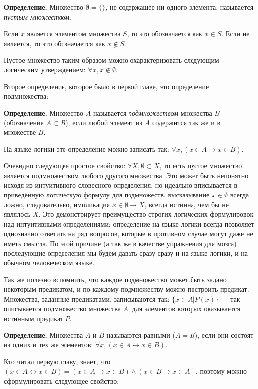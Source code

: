 {\bfseries Определение.} Множество $\emptyset=\{\}$, не содержащее ни одного элемента, называется {\slshape пустым множеством}.

Если $x$ является элементом множества $S$, то это обозначается как $x \in S$. Если не является, то это обозначается как $x \not\in S$.

Пустое множество таким образом можно охарактеризовать следующим логическим утверждением: $\forall x, x \not \in \emptyset$.

Второе определение, которое было в первой главе, это определение подмножества:

{\bfseries Определение.} Множество $A$ называется {\slshape подмножеством} множества $B$ (обозначение $A\subset B$), если любой элемент из $A$ содержится так же и в множестве $B$.

На языке логики это определение можно записать так: $\forall x, (x\in A\rightarrow x\in B)$.

Очевидно следующее простое свойство: $\forall X, \emptyset\subset X$, то есть пустое множество является подмножеством любого другого множества. Это может быть непонятно исходя из интуитивного словесного определения, но идеально вписывается в приведённую логическую формулу для подмножеств: высказывание $x\in\emptyset$ всегда ложно, следовательно, импликация $x\in\emptyset \rightarrow X$, всегда истинна, чем бы не являлось $X$. Это демонстрирует преимущество строгих логических формулировок над интуитивными определениями: определение на языке логики всегда позволяет однозначно ответить на ряд вопросов, которые в противном случае могут даже не иметь смысла. По этой причине (а так же в качестве упражнения для мозга) последующие определения мы будем давать сразу сразу и на языке логики, и на обычном человеческом языке.

Так же полезно вспомнить, что каждое подмножество может быть задано некоторым предикатом, и по каждому подмножеству можно построить предикат. Множества, заданные предикатами, записываются так: $\{x \in A|P(x)\}$ — так описывается подмножество множества $A$, для элементов которых оказывается истинным предикат $P$.

{\bfseries Определение.} Множества $A$ и $B$ называются равными ($A=B$), если они состоят из одних и тех же элементов: $\forall x, (x\in A \leftrightarrow x\in B)$.

Кто читал первую главу, знает, что $(x\in A \leftrightarrow x\in B) = (x \in A \rightarrow x \in B) \wedge (x \in B \rightarrow x \in A)$, поэтому можно сформулировать следующее свойство:

